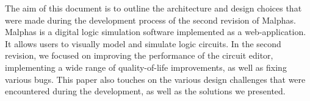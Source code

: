 The aim of this document is to outline the architecture and design choices that were made during the development process
of the second revision of Malphas.
Malphas is a digital logic simulation software implemented as a web-application. It allows users to visually model and simulate
logic circuits. In the second revision, we focused on improving the performance of the circuit editor, implementing a wide
range of quality-of-life improvements, as well as fixing various bugs.
This paper also touches on the various design challenges that were encountered during the development, as well as the
solutions we presented.
